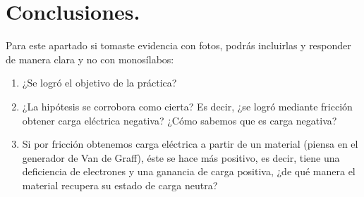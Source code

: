 \documentclass[14pt]{extarticle}
\begin{document}
\section{Conclusiones.}

Para este apartado si tomaste evidencia con fotos, podrás incluirlas y responder de manera clara y no con monosílabos:
\begin{enumerate}[label=\Roman*)]
\item ¿Se logró el objetivo de la práctica?
\item ¿La hipótesis se corrobora como cierta? Es decir, ¿se logró mediante fricción obtener carga eléctrica negativa? ¿Cómo sabemos que es carga negativa?
\item Si por fricción obtenemos carga eléctrica a partir de un material (piensa en el generador de Van de Graff), éste se hace más positivo, es decir, tiene una deficiencia de electrones y una ganancia de carga positiva, ¿de qué manera el material recupera su estado de carga neutra?
\end{enumerate}
\end{document}
